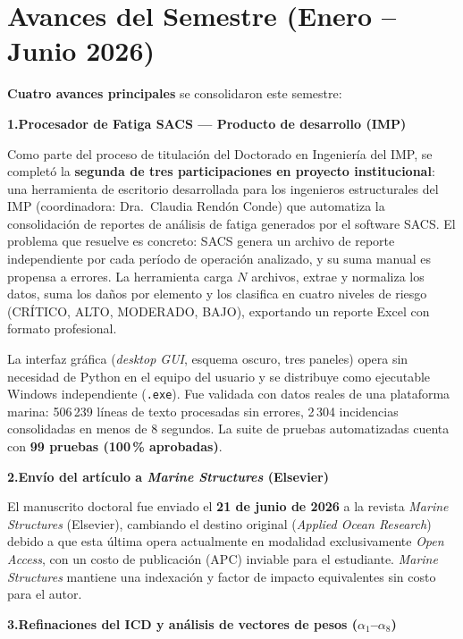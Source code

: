 \documentclass[12pt]{article}
\begin{document}
\section{Avances del Semestre (Enero -- Junio 2026)}

\textbf{Cuatro avances principales} se consolidaron este semestre:

\medskip
\noindent\textbf{1.\enspace Procesador de Fatiga SACS — Producto de desarrollo (IMP)}

Como parte del proceso de titulación del Doctorado en Ingeniería del IMP, se completó la
\textbf{segunda de tres participaciones en proyecto institucional}: una herramienta de
escritorio desarrollada para los ingenieros estructurales del IMP
(coordinadora: Dra.\ Claudia Rendón Conde) que automatiza la consolidación de reportes
de análisis de fatiga generados por el software SACS. El problema que resuelve es concreto:
SACS genera un archivo de reporte independiente por cada período de operación analizado,
y su suma manual es propensa a errores. La herramienta carga $N$ archivos, extrae y normaliza
los datos, suma los daños por elemento y los clasifica en cuatro niveles de riesgo (CRÍTICO,
ALTO, MODERADO, BAJO), exportando un reporte Excel con formato profesional.

La interfaz gráfica (\textit{desktop GUI}, esquema oscuro, tres paneles) opera sin necesidad de
Python en el equipo del usuario y se distribuye como ejecutable Windows independiente (\texttt{.exe}).
Fue validada con datos reales de una plataforma marina: 506\,239 líneas de texto procesadas
sin errores, 2\,304 incidencias consolidadas en menos de 8 segundos.
La suite de pruebas automatizadas cuenta con \textbf{99 pruebas (100\,\% aprobadas)}.

\medskip
\noindent\textbf{2.\enspace Envío del artículo a \textit{Marine Structures} (Elsevier)}

El manuscrito doctoral fue enviado el \textbf{21 de junio de 2026} a la revista
\textit{Marine Structures} (Elsevier), cambiando el destino original (\textit{Applied Ocean Research})
debido a que esta última opera actualmente en modalidad exclusivamente \textit{Open Access},
con un costo de publicación (APC) inviable para el estudiante.
\textit{Marine Structures} mantiene una indexación y factor de impacto equivalentes sin costo para el autor.

\medskip
\noindent\textbf{3.\enspace Refinaciones del ICD y análisis de vectores de pesos ($\alpha_1$--$\alpha_8$)}
\end{document}
